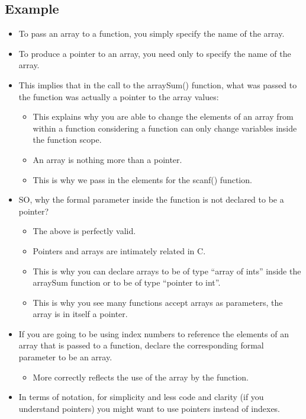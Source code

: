 \subsection{Example}
\begin{itemize}
    \item To pass an array to a function, you simply specify the name of the array. 
    \item To produce a pointer to an array, you need only to specify the name of the array.
    \item This implies that in the call to the arraySum() function, what was passed to the function was actually a pointer to the array values:
        \begin{itemize}
            \item This explains why you are able to change the elements of an array from within a function considering a function can only change variables inside the function scope. 
            \item An array is nothing more than a pointer.
            \item This is why we pass in the elements for the scanf() function. 
        \end{itemize}
    
    \item SO, why the formal parameter inside the function is not declared to be a pointer?
        \begin{itemize}
            \item The above is perfectly valid. 
            \item Pointers and arrays are intimately related in C. 
            \item This is why you can declare arrays to be of type ``array of ints'' inside the arraySum function or to be of type ``pointer to int''.
            \item This is why you see many functions accept arrays as parameters, the array is in itself a pointer. 
        \end{itemize}
    
    \item If you are going to be using index numbers to reference the elements of an array that is passed to a function, declare the corresponding formal parameter to be an array. 
        \begin{itemize}
            \item More correctly reflects the use of the array by the function. 
        \end{itemize}
    
    \item In terms of notation, for simplicity and less code and clarity (if you understand pointers) you might want to use pointers instead of indexes. 
\end{itemize}

